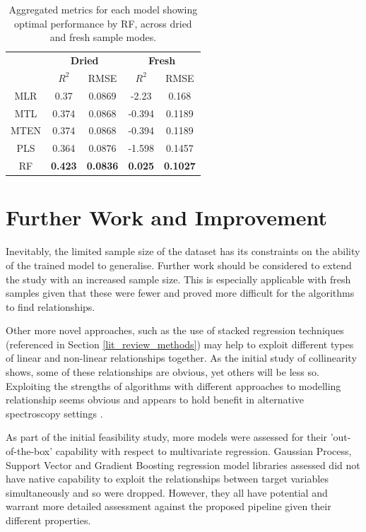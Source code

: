 \documentclass[conference]{IEEEtran}
\begin{document}
\begin{table}[htbp]
\caption{Aggregated metrics for each model showing optimal performance by RF, across dried and fresh sample modes.}
\begin{center}
\begin{tabular}{|c|c|c|c|c|}
\cline{2-5}
\multicolumn{1}{c|}{ } & \multicolumn{2}{|c|}{\textbf{Dried}} & \multicolumn{2}{|c|}{\textbf{Fresh}} \\
\cline{2-5}
\multicolumn{1}{c|}{ } & \textbf{$R^2$} & RMSE & \textbf{$R^2$} & RMSE \\
\hline
MLR & 0.37 & 0.0869 & -2.23 & 0.168 \\
MTL & 0.374 & 0.0868 & -0.394 & 0.1189 \\
MTEN & 0.374 & 0.0868 & -0.394 & 0.1189 \\
PLS & 0.364 & 0.0876 & -1.598 & 0.1457 \\
RF & {\color{blue}\textbf{0.423}} & {\color{blue}\textbf{0.0836}} & {\color{blue}\textbf{0.025}} & {\color{blue}\textbf{0.1027}} \\
\hline
\end{tabular}
\label{tab:agg_results}
\end{center}
\end{table}

\section{Further Work and Improvement}
Inevitably, the limited sample size of the dataset has its constraints on the ability of the trained model to generalise. Further work should be considered to extend the study with an increased sample size. This is especially applicable with fresh samples given that these were fewer and proved more difficult for the algorithms to find relationships.

Other more novel approaches, such as the use of stacked regression techniques (referenced in Section \ref{lit_review_methods}) may help to exploit different types of linear and non-linear relationships together. As the initial study of collinearity shows, some of these relationships are obvious, yet others will be less so. Exploiting the strengths of algorithms with different approaches to modelling relationship seems obvious and appears to hold benefit in alternative spectroscopy settings \cite{Cobbinah2022, Solihin2024}.

As part of the initial feasibility study, more models were assessed for their 'out-of-the-box' capability with respect to multivariate regression. Gaussian Process, Support Vector and Gradient Boosting regression model libraries assessed did not have native capability to exploit the relationships between target variables simultaneously and so were dropped. However, they all have potential and warrant more detailed assessment against the proposed pipeline given their different properties.
\end{document}
